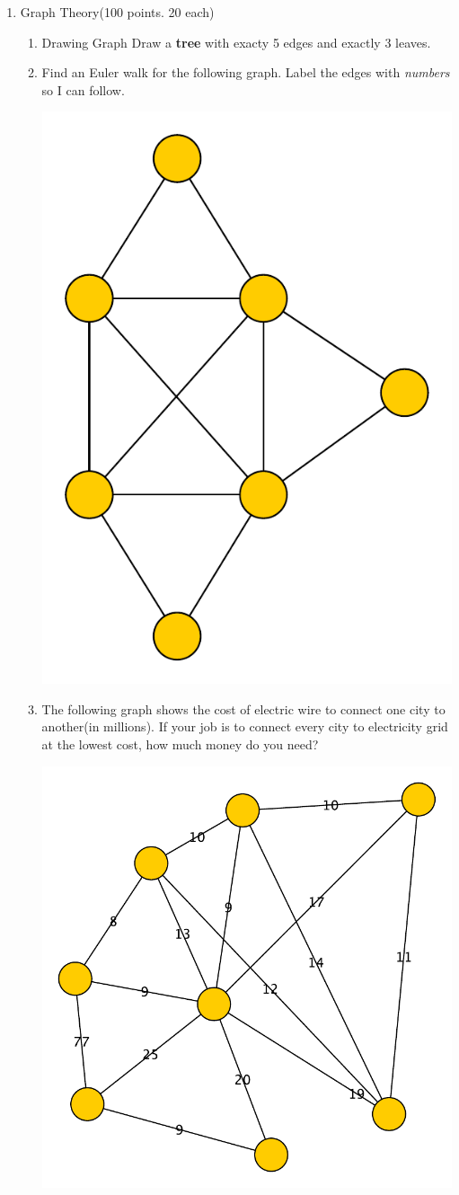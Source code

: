\documentclass[a4paper, 12pt]{article}
\newcommand{\sanswer}{\vspace{1.25in}}
\begin{document}
\begin{enumerate}
	\item Graph Theory(100 points. 20 each)
	\begin{enumerate}
		\item Drawing Graph
		Draw a \textbf{tree} with exacty 5 edges and exactly 3 leaves.
		\sanswer
		\item Find an Euler walk for the following graph. Label the edges with \emph{numbers} so I can follow.	
			\begin{center}
			\includegraphics[width=0.5\linewidth]{eulertour}
			\end{center}
		\newpage
		\item The following graph shows the cost of electric wire to connect one city to another(in millions). If your job is to connect every city to electricity grid at the lowest cost, how much money do you need?
			\begin{center}
			\includegraphics[width=0.7\linewidth]{shortestpath}

\end{center}
\end{enumerate}
\end{enumerate}
\end{document}

